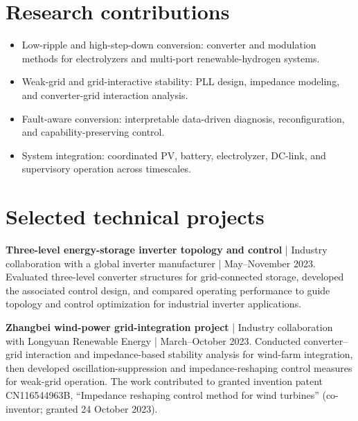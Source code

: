\documentclass[10pt,a4paper]{article}
\begin{document}
\section*{Research contributions}

\begin{itemize}\item Low-ripple and high-step-down conversion: converter and modulation methods for electrolyzers and multi-port renewable-hydrogen systems.\end{itemize}

\begin{itemize}\item Weak-grid and grid-interactive stability: PLL design, impedance modeling, and converter-grid interaction analysis.\end{itemize}

\begin{itemize}\item Fault-aware conversion: interpretable data-driven diagnosis, reconfiguration, and capability-preserving control.\end{itemize}

\begin{itemize}\item System integration: coordinated PV, battery, electrolyzer, DC-link, and supervisory operation across timescales.\end{itemize}

\section*{Selected technical projects}

\textbf{Three-level energy-storage inverter topology and control} | Industry collaboration with a global inverter manufacturer | May--November 2023. Evaluated three-level converter structures for grid-connected storage, developed the associated control design, and compared operating performance to guide topology and control optimization for industrial inverter applications.\par

\textbf{Zhangbei wind-power grid-integration project} | Industry collaboration with Longyuan Renewable Energy | March--October 2023. Conducted converter--grid interaction and impedance-based stability analysis for wind-farm integration, then developed oscillation-suppression and impedance-reshaping control measures for weak-grid operation. The work contributed to granted invention patent CN116544963B, ``Impedance reshaping control method for wind turbines'' (co-inventor; granted 24 October 2023).\par
\end{document}
